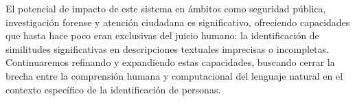 \documentclass[12pt,a4paper]{article}
\begin{document}
El potencial de impacto de este sistema en ámbitos como seguridad pública, investigación forense y atención ciudadana es significativo, ofreciendo capacidades que hasta hace poco eran exclusivas del juicio humano: la identificación de similitudes significativas en descripciones textuales imprecisas o incompletas. Continuaremos refinando y expandiendo estas capacidades, buscando cerrar la brecha entre la comprensión humana y computacional del lenguaje natural en el contexto específico de la identificación de personas.
\end{document}
